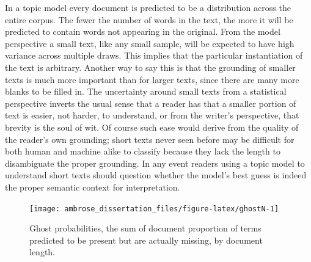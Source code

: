 \documentclass[]{book}
\theoremstyle{definition}
\theoremstyle{definition}
\theoremstyle{definition}
\theoremstyle{remark}
\begin{document}
In a topic model every document is predicted to be a distribution across
the entire corpus. The fewer the number of words in the text, the more
it will be predicted to contain words not appearing in the original.
From the model perspective a small text, like any small sample, will be
expected to have high variance across multiple draws. This implies that
the particular instantiation of the text is arbitrary. Another way to
say this is that the grounding of smaller texts is much more important
than for larger texts, since there are many more blanks to be filled in.
The uncertainty around small texts from a statistical perspective
inverts the usual sense that a reader has that a smaller portion of text
is easier, not harder, to understand, or from the writer's perspective,
that brevity is the soul of wit. Of course such ease would derive from
the quality of the reader's own grounding; short texts never seen before
may be difficult for both human and machine alike to classify because
they lack the length to disambiguate the proper grounding. In any event
readers using a topic model to understand short texts should question
whether the model's best guess is indeed the proper semantic context for
interpretation.

\begin{figure}

{\centering \texttt{[image: ambrose\_dissertation\_files/figure-latex/ghostN-1]} 

}

\caption{Ghost probabilities, the sum of document proportion of terms predicted to be present but are actually missing, by document length.}\label{fig:ghostN}
\end{figure}
\end{document}
